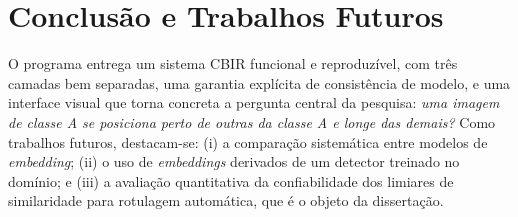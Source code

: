 \documentclass[10pt]{article}
\begin{document}
\section{Conclusão e Trabalhos Futuros}

O programa entrega um sistema CBIR funcional e reproduzível, com três camadas
bem separadas, uma garantia explícita de consistência de modelo, e uma interface
visual que torna concreta a pergunta central da pesquisa: \emph{uma imagem de
classe A se posiciona perto de outras da classe A e longe das demais?} Como
trabalhos futuros, destacam-se: (i) a comparação sistemática entre modelos de
\emph{embedding}; (ii) o uso de \emph{embeddings} derivados de um detector
treinado no domínio; e (iii) a avaliação quantitativa da confiabilidade dos
limiares de similaridade para rotulagem automática, que é o objeto da
dissertação.

\printbibliography
\end{document}
